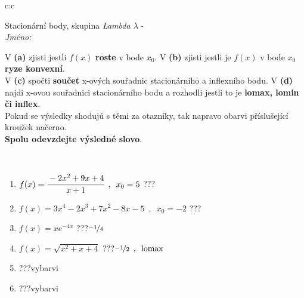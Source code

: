 \documentclass[10pt]{report}
\begin{document}
\newpage
\thispagestyle{empty}
\begin{tabular}{c:c}
\begin{minipage}[c][104.5mm][t]{0.5\linewidth}
\begin{center}
\vspace{7mm}
{\huge Stacionární body, skupina \textit{Lambda $\lambda$} -}\\[5mm]
\textit{Jméno:}\phantom{xxxxxxxxxxxxxxxxxxxxxxxxxxxxxxxxxxxxxxxxxxxxxxxxxxxxxxxxxxxxxxxxx}\\[5mm]
\begin{minipage}{0.95\linewidth}
\begin{center}
{\small V \textbf{(a)} zjisti jestli $f(x)$ \textbf{roste} v bode $x_0$. V \textbf{(b)} zjisti jestli je $f(x)$ v bode $x_0$ \textbf{ryze konvexní}.\\V \textbf{(c)} spočti \textbf{součet} x-ových souřadnic stacionárního a inflexního bodu. V \textbf{(d)} najdi x-ovou souřadnici stacionárního bodu a rozhodli jestli to je \textbf{lomax, lomin či inflex}.\\Pokud se výsledky shodujú s těmi za otazníky, tak napravo obarvi příslušející kroužek načerno.\\\textbf{Spolu odevzdejte výsledné slovo}}.
\end{center}
\end{minipage}
\\[1mm]
\begin{minipage}{0.79\linewidth}
\begin{center}
\begin{varwidth}{\linewidth}
\begin{enumerate}
\normalsize
\item $f(x)=\cfrac{-2x^2+9x+4}{x+1}\enspace , \enspace x_0=5$\quad \dotfill\; ???\;\dotfill \quad {}
\item $f(x)=3x^4-2x^3+7x^2-8x-5\enspace , \enspace x_0=-2$\quad \dotfill\; ???\;\dotfill \quad {}
\item $f(x)=xe^{-4x}$\quad \dotfill\; ???\;\dotfill \quad $\nicefrac{-1}{4}$
\item $f(x)=\sqrt{x^2+x+4}$\quad \dotfill\; ???\;\dotfill \quad $\nicefrac{-1}{2}\enspace , \enspace\mathrm{lomax}$
\item \quad \dotfill\; ???\;\dotfill \quad vybarvi
\item \quad \dotfill\; ???\;\dotfill \quad vybarvi
\end{enumerate}
\end{varwidth}
\end{center}

\end{minipage}
\end{center}
\end{minipage}
\end{tabular}
\end{document}
